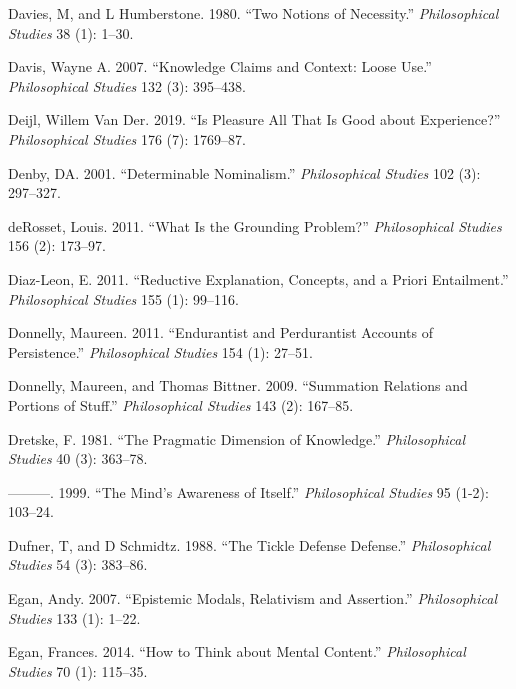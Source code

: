 \documentclass[
  10pt,
  letterpaper,
  DIV=11,
  numbers=noendperiod,
  twoside]{scrartcl}
\newlength{\cslhangindent}
\newenvironment{CSLReferences}[2] %
 {\begin{list}{}{%
  \setlength{\itemindent}{0pt}
  \setlength{\leftmargin}{0pt}
  \setlength{\parsep}{0pt}
  \ifodd #1
   \setlength{\leftmargin}{\cslhangindent}
   \setlength{\itemindent}{-1\cslhangindent}
  \fi
  \setlength{\itemsep}{#2\baselineskip}}}
 {\end{list}}
\begin{document}
\begin{CSLReferences}{1}{0}
Davies, M, and L Humberstone. 1980. {``Two Notions of Necessity.''}
\emph{Philosophical Studies} 38 (1): 1--30.

Davis, Wayne A. 2007. {``Knowledge Claims and Context: Loose Use.''}
\emph{Philosophical Studies} 132 (3): 395--438.

Deijl, Willem Van Der. 2019. {``Is Pleasure All That Is Good about
Experience?''} \emph{Philosophical Studies} 176 (7): 1769--87.

Denby, DA. 2001. {``Determinable Nominalism.''} \emph{Philosophical
Studies} 102 (3): 297--327.

deRosset, Louis. 2011. {``What Is the Grounding Problem?''}
\emph{Philosophical Studies} 156 (2): 173--97.

Diaz-Leon, E. 2011. {``Reductive Explanation, Concepts, and a Priori
Entailment.''} \emph{Philosophical Studies} 155 (1): 99--116.

Donnelly, Maureen. 2011. {``Endurantist and Perdurantist Accounts of
Persistence.''} \emph{Philosophical Studies} 154 (1): 27--51.

Donnelly, Maureen, and Thomas Bittner. 2009. {``Summation Relations and
Portions of Stuff.''} \emph{Philosophical Studies} 143 (2): 167--85.

Dretske, F. 1981. {``The Pragmatic Dimension of Knowledge.''}
\emph{Philosophical Studies} 40 (3): 363--78.

---------. 1999. {``The Mind's Awareness of Itself.''}
\emph{Philosophical Studies} 95 (1-2): 103--24.

Dufner, T, and D Schmidtz. 1988. {``The Tickle Defense Defense.''}
\emph{Philosophical Studies} 54 (3): 383--86.

Egan, Andy. 2007. {``Epistemic Modals, Relativism and Assertion.''}
\emph{Philosophical Studies} 133 (1): 1--22.

Egan, Frances. 2014. {``How to Think about Mental Content.''}
\emph{Philosophical Studies} 70 (1): 115--35.


\end{CSLReferences}
\end{document}
